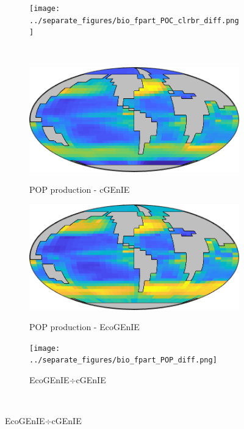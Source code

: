 \documentclass{article}
\begin{document}
\begin{figure}[htp]
\begin{subfigure}{.49\textwidth}
\end{subfigure}
\begin{subfigure}{.49\textwidth}
 \centering
\texttt{[image: ../separate\_figures/bio\_fpart\_POC\_clrbr\_diff.png]}
\end{subfigure}
\\[+0.2cm]
\begin{subfigure}{.33\textwidth}
 \centering
 \caption{POP production - cGEnIE}
 \includegraphics[width=0.95\linewidth]{../separate_figures/BIOGEM/bio_fpart_POP.png}
 \label{fig:dpCO2_1}
\end{subfigure}%
\begin{subfigure}{.33\textwidth}
 \caption{POP production - EcoGEnIE}
 \includegraphics[width=0.95\linewidth]{../separate_figures/ECOGEM/bio_fpart_POP.png}
 \label{fig:dpCO2_2}
\end{subfigure}
\begin{subfigure}{.33\textwidth}
 \caption{EcoGEnIE$\div$cGEnIE}
\texttt{[image: ../separate\_figures/bio\_fpart\_POP\_diff.png]}
 \label{fig:dpCO2_2}
\end{subfigure}
\\[+0.2cm]

\end{figure}
\end{document}
